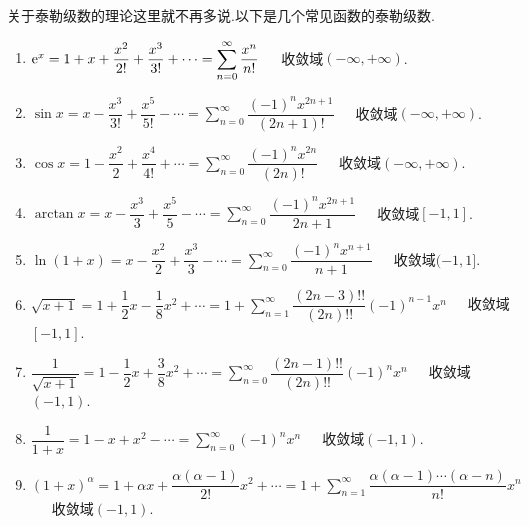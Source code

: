 \documentclass{ctexart}
\begin{document}
关于泰勒级数的理论这里就不再多说.以下是几个常见函数的泰勒级数.
\begin{enumerate}[label=\tbf{(\arabic*)},leftmargin=*]
    \item $\mathrm{e}^x=1+x+\dfrac{x^2}{2!}+\dfrac{x^3}{3!}+\cdots=\displaystyle\sum_{n=0}^\infty\dfrac{x^n}{n!}$\ \ \ 收敛域$(-\infty,+\infty)$.
    \item $\sin x=x-\dfrac{x^3}{3!}+\dfrac{x^5}{5!}-\cdots=\displaystyle\sum_{n=0}^\infty\dfrac{(-1)^{n}x^{2n+1}}{(2n+1)!}$\ \ \ 收敛域$(-\infty,+\infty)$.
    \item $\cos x=1-\dfrac{x^2}{2}+\dfrac{x^4}{4!}+\cdots=\displaystyle\sum_{n=0}^\infty\dfrac{(-1)^{n}x^{2n}}{(2n)!}$\ \ \ 收敛域$(-\infty,+\infty)$.
    \item $\arctan x=x-\dfrac{x^3}{3}+\dfrac{x^5}{5}-\cdots=\displaystyle\sum_{n=0}^\infty\dfrac{(-1)^nx^{2n+1}}{2n+1}$\ \ \ 收敛域$[-1,1]$.
    \item $\ln(1+x)=x-\dfrac{x^2}{2}+\dfrac{x^3}{3}-\cdots=\displaystyle\sum_{n=0}^\infty\dfrac{(-1)^nx^{n+1}}{n+1}$\ \ \ 收敛域$(-1,1]$.
    \item $\sqrt{x+1}=1+\dfrac{1}{2}x-\dfrac{1}{8}x^2+\cdots=1+\displaystyle\sum_{n=1}^\infty\dfrac{(2n-3)!!}{(2n)!!}(-1)^{n-1}x^n$\ \ \ 收敛域$[-1,1]$.
    \item $\dfrac{1}{\sqrt{x+1}}=1-\dfrac12x+\dfrac{3}{8}x^2+\cdots=\displaystyle\sum_{n=0}^\infty\dfrac{(2n-1)!!}{(2n)!!}(-1)^nx^n$\ \ \ 收敛域$(-1,1)$.
    \item $\dfrac{1}{1+x}=1-x+x^2-\cdots=\displaystyle\sum_{n=0}^\infty(-1)^nx^n$\ \ \ 收敛域$(-1,1)$.
    \item $(1+x)^\alpha=1+\alpha x+\dfrac{\alpha(\alpha-1)}{2!}x^2+\cdots=1+\displaystyle\sum_{n=1}^\infty\dfrac{\alpha(\alpha-1)\cdots(\alpha-n)}{n!}x^n$\ \ \ 收敛域$(-1,1)$.
\end{enumerate}
\end{document}
